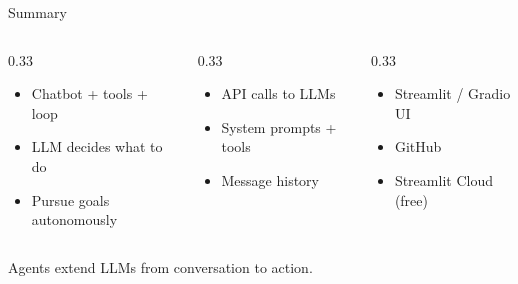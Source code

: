 \documentclass[aspectratio=169]{beamer}
\begin{document}
\begin{frame}{Summary}
\begin{columns}[T]
\begin{column}{0.33\textwidth}
\begin{shadedbox}[title=\textbf{Agents}]
\begin{itemize}\small
  \item Chatbot + tools + loop
  \item LLM decides what to do
  \item Pursue goals autonomously
\end{itemize}
\end{shadedbox}
\end{column}
\begin{column}{0.33\textwidth}
\begin{shadedbox}[title=\textbf{Building Blocks}]
\begin{itemize}\small
  \item API calls to LLMs
  \item System prompts + tools
  \item Message history
\end{itemize}
\end{shadedbox}
\end{column}
\begin{column}{0.33\textwidth}
\begin{shadedbox}[title=\textbf{Deployment}]
\begin{itemize}\small
  \item Streamlit / Gradio UI
  \item GitHub
  \item Streamlit Cloud (free)
\end{itemize}
\end{shadedbox}
\end{column}
\end{columns}
\vspace{0.5cm}
\begin{center}
\alert{Agents extend LLMs from conversation to action.}
\end{center}
\end{frame}
\end{document}
